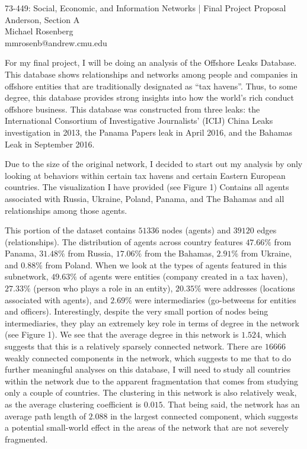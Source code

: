 \documentclass[11pt]{article}
\makeatletter
\newcommand{\myname}{Michael Rosenberg}
\newcommand{\myandrew}{mmrosenb@andrew.cmu.edu}
\newcommand{\mycourse}{73-449: Social, Economic, and Information Networks}
\newcommand{\myhwname}{| Final Project Proposal}
\newcommand{\myrecitation}{Anderson, Section A}
\newcommand{\myteammates}{}
\makeatother
\begin{document}
\begin{center}
    {\Large \mycourse} {\Large \myhwname} \\
    \myrecitation \\
    \myname \\
    \myandrew \\
\end{center}

For my final project, I will be doing an analysis of the Offshore Leaks
Database. This database shows relationships and networks among people and
companies in offshore entities that are traditionally designated as ``tax
havens''. Thus, to some degree, this database provides strong insights into how
the world's rich conduct offshore business. This database was constructed from
three leaks: the International Consortium of Investigative Journalists' (ICIJ)
China Leaks investigation in 2013, the Panama Papers leak in April 2016, and the
Bahamas Leak in September 2016.

Due to the size of the original network, I decided to start out my analysis by
only looking at behaviors within certain tax havens and certain Eastern
European countries. The visualization I have provided (see Figure 1) Contains
all agents associated with Russia, Ukraine, Poland, Panama, and The Bahamas and
all relationships among those agents.

This portion of the dataset contains $51336$ nodes (agents) and $39120$ edges
(relationships). The distribution of agents across country features $47.66\%$
from Panama, $31.48\%$ from Russia, $17.06\%$ from the Bahamas, $2.91\%$ from
Ukraine, and $0.88\%$ from Poland. When we look at the types of agents featured
in this subnetwork, $49.63\%$ of agents were entities (company created in
a tax haven), $27.33\%$ (person who plays a role in an entity), $20.35\%$ were
addresses (locations associated with agents), and $2.69\%$ were intermediaries
(go-betweens for entities and officers). Interestingly, despite the very
small portion of nodes being intermediaries, they play an extremely key role
in terms of degree in the network (see Figure 1). We see that the average
degree in this network is $1.524$, which suggests that this is a relatively
sparsely connected network. There are $16666$ weakly connected components in
the network, which suggests to me that to do further meaningful analyses on
this database, I will need to study all countries within the network due to the
apparent fragmentation that comes from studying only a couple of countries.
The clustering in this network is also relatively weak, as the average
clustering coefficient is $0.015.$ That being said, the network has an
average path length of $2.088$ in the largest connected component, which
suggests a potential small-world effect in the areas of the network that are
not severely fragmented.
\end{document}
